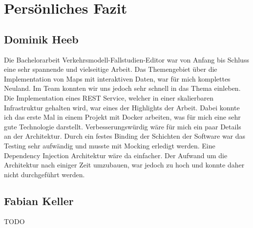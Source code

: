 \section{Persönliches Fazit}
\subsection{Dominik Heeb}
Die Bachelorarbeit Verkehrsmodell-Fallstudien-Editor war von Anfang bis Schluss eine sehr spannende und vielseitige Arbeit. Das Themengebiet über die Implementation von Maps mit interaktiven Daten, war für mich komplettes Neuland. Im Team konnten wir uns jedoch sehr schnell in das Thema einleben. Die Implementation eines REST Service, welcher in einer skalierbaren Infrastruktur gehalten wird, war eines der Highlights der Arbeit. Dabei konnte ich das erste Mal in einem Projekt mit Docker arbeiten, was für mich eine sehr gute Technologie darstellt. Verbesserungswürdig wäre für mich ein paar Details an der Architektur. Durch ein festes Binding der Schichten der Software war das Testing sehr aufwändig und musste mit Mocking erledigt werden. Eine Dependency Injection Architektur wäre da einfacher. Der Aufwand um die Architektur nach einiger Zeit umzubauen, war jedoch zu hoch und konnte daher nicht durchgeführt werden.
\subsection{Fabian Keller}
TODO